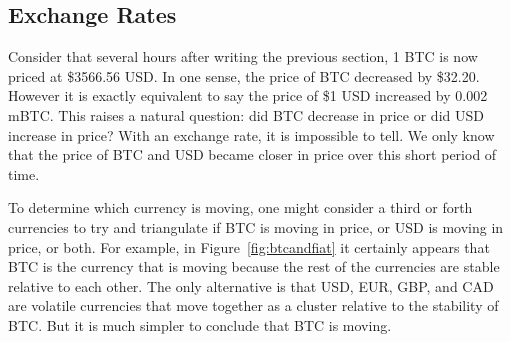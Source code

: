 \subsection{Exchange Rates} 

Consider that several hours after writing the previous section, 1 BTC is now priced at \$3566.56 USD. In one sense, the price of BTC decreased by \$32.20. However it is exactly equivalent to say the price of \$1 USD increased by 0.002 mBTC. This raises a natural question: did BTC decrease in price or did USD increase in price? With an exchange rate, it is impossible to tell. We only know that the price of BTC and USD became closer in price over this short period of time.

To determine which currency is moving, one might consider a third or forth currencies to try and triangulate if BTC is moving in price, or USD is moving in price, or both. For example, in Figure~\ref{fig:btcandfiat} it certainly appears that BTC is the currency that is moving because the rest of the currencies are stable relative to each other. The only alternative is that USD, EUR, GBP, and CAD are volatile currencies that move together as a cluster relative to the stability of BTC. But it is much simpler to conclude that BTC is moving. 

